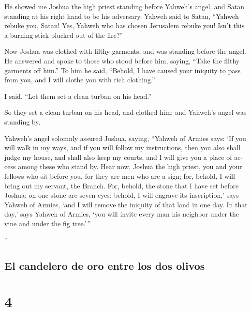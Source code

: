 \begin{paracol}{2}
\begin{otherlanguage}{english}
 He showed me Joshua the high priest standing before
Yahweh's angel, and Satan standing at his right hand to be his
adversary.  Yahweh said to Satan, ``Yahweh rebuke you,
Satan! Yes, Yahweh who has chosen Jerusalem rebuke you! Isn't this a
burning stick plucked out of the fire?''

 Now Joshua was clothed with filthy garments, and was
standing before the angel.  He answered and spoke to those
who stood before him, saying, ``Take the filthy garments off him.'' To
him he said, ``Behold, I have caused your iniquity to pass from you, and
I will clothe you with rich clothing.''

 I said, ``Let them set a clean turban on his head.''

So they set a clean turban on his head, and clothed him; and Yahweh's
angel was standing by.

 Yahweh's angel solomnly assured Joshua, saying,
 ``Yahweh of Armies says: `If you will walk in my ways,
and if you will follow my instructions, then you also shall judge my
house, and shall also keep my courts, and I will give you a place of
access among these who stand by.  Hear now, Joshua the
high priest, you and your fellows who sit before you, for they are men
who are a sign; for, behold, I will bring out my servant, the Branch.
 For, behold, the stone that I have set before Joshua: on
one stone are seven eyes; behold, I will engrave its inscription,' says
Yahweh of Armies, `and I will remove the iniquity of that land in one
day.  In that day,' says Yahweh of Armies, `you will
invite every man his neighbor under the vine and under the fig
tree.'\,''

\end{otherlanguage}

\switchcolumn[0]*

\hypertarget{el-candelero-de-oro-entre-los-dos-olivos}{%
\subsection{El candelero de oro entre los dos
olivos}\label{el-candelero-de-oro-entre-los-dos-olivos}}

\hypertarget{section-6}{%
\section{4}\label{section-6}}


\end{paracol}
